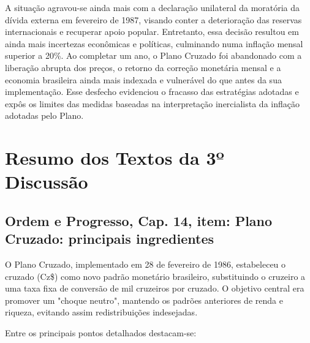 \documentclass[a4paper,12pt]{article}[abntex2]
\begin{document}
A situação agravou-se ainda mais com a declaração unilateral da moratória da dívida externa em fevereiro de 1987, visando conter a deterioração das reservas internacionais e recuperar apoio popular. Entretanto, essa decisão resultou em ainda mais incertezas econômicas e políticas, culminando numa inflação mensal superior a 20\%. Ao completar um ano, o Plano Cruzado foi abandonado com a liberação abrupta dos preços, o retorno da correção monetária mensal e a economia brasileira ainda mais indexada e vulnerável do que antes da sua implementação. Esse desfecho evidenciou o fracasso das estratégias adotadas e expôs os limites das medidas baseadas na interpretação inercialista da inflação adotadas pelo Plano.

\newpage
\section{\textbf{Resumo dos Textos da 3º Discussão}}
\subsection{\textbf{Ordem e Progresso, Cap. 14, item: Plano Cruzado: principais ingredientes}}

O Plano Cruzado, implementado em 28 de fevereiro de 1986, estabeleceu o cruzado (Cz\$) como novo padrão monetário brasileiro, substituindo o cruzeiro a uma taxa fixa de conversão de mil cruzeiros por cruzado. O objetivo central era promover um "choque neutro", mantendo os padrões anteriores de renda e riqueza, evitando assim redistribuições indesejadas.

Entre os principais pontos detalhados destacam-se:
\end{document}

